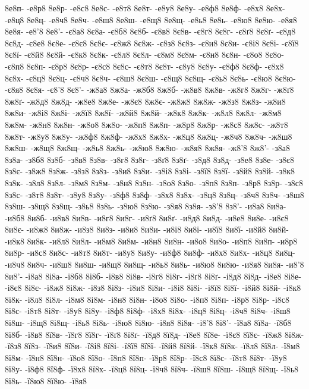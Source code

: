 {8е8п-
-е8р8
8е8р-
-е8с8
8е8с-
-е8т8
8е8т-
-е8у8
8е8у-
-е8ф8
8е8ф-
-е8х8
8е8х-
-е8ц8
8е8ц-
-е8ч8
8е8ч-
-е8ш8
8е8ш-
-е8щ8
8е8щ-
-е8ь8
8е8ь-
-е8ю8
8е8ю-
-е8я8
8е8я-
-е8'8
8е8'-
-є8а8
8є8а-
-є8б8
8є8б-
-є8в8
8є8в-
-є8г8
8є8г-
-є8ґ8
8є8ґ-
-є8д8
8є8д-
-є8е8
8є8е-
-є8є8
8є8є-
-є8ж8
8є8ж-
-є8з8
8є8з-
-є8и8
8є8и-
-є8і8
8є8і-
-є8ї8
8є8ї-
-є8й8
8є8й-
-є8к8
8є8к-
-є8л8
8є8л-
-є8м8
8є8м-
-є8н8
8є8н-
-є8о8
8є8о-
-є8п8
8є8п-
-є8р8
8є8р-
-є8с8
8є8с-
-є8т8
8є8т-
-є8у8
8є8у-
-є8ф8
8є8ф-
-є8х8
8є8х-
-є8ц8
8є8ц-
-є8ч8
8є8ч-
-є8ш8
8є8ш-
-є8щ8
8є8щ-
-є8ь8
8є8ь-
-є8ю8
8є8ю-
-є8я8
8є8я-
-є8'8
8є8'-
-ж8а8
8ж8а-
-ж8б8
8ж8б-
-ж8в8
8ж8в-
-ж8г8
8ж8г-
-ж8ґ8
8ж8ґ-
-ж8д8
8ж8д-
-ж8е8
8ж8е-
-ж8є8
8ж8є-
-ж8ж8
8ж8ж-
-ж8з8
8ж8з-
-ж8и8
8ж8и-
-ж8і8
8ж8і-
-ж8ї8
8ж8ї-
-ж8й8
8ж8й-
-ж8к8
8ж8к-
-ж8л8
8ж8л-
-ж8м8
8ж8м-
-ж8н8
8ж8н-
-ж8о8
8ж8о-
-ж8п8
8ж8п-
-ж8р8
8ж8р-
-ж8с8
8ж8с-
-ж8т8
8ж8т-
-ж8у8
8ж8у-
-ж8ф8
8ж8ф-
-ж8х8
8ж8х-
-ж8ц8
8ж8ц-
-ж8ч8
8ж8ч-
-ж8ш8
8ж8ш-
-ж8щ8
8ж8щ-
-ж8ь8
8ж8ь-
-ж8ю8
8ж8ю-
-ж8я8
8ж8я-
-ж8'8
8ж8'-
-з8а8
8з8а-
-з8б8
8з8б-
-з8в8
8з8в-
-з8г8
8з8г-
-з8ґ8
8з8ґ-
-з8д8
8з8д-
-з8е8
8з8е-
-з8є8
8з8є-
-з8ж8
8з8ж-
-з8з8
8з8з-
-з8и8
8з8и-
-з8і8
8з8і-
-з8ї8
8з8ї-
-з8й8
8з8й-
-з8к8
8з8к-
-з8л8
8з8л-
-з8м8
8з8м-
-з8н8
8з8н-
-з8о8
8з8о-
-з8п8
8з8п-
-з8р8
8з8р-
-з8с8
8з8с-
-з8т8
8з8т-
-з8у8
8з8у-
-з8ф8
8з8ф-
-з8х8
8з8х-
-з8ц8
8з8ц-
-з8ч8
8з8ч-
-з8ш8
8з8ш-
-з8щ8
8з8щ-
-з8ь8
8з8ь-
-з8ю8
8з8ю-
-з8я8
8з8я-
-з8'8
8з8'-
-и8а8
8и8а-
-и8б8
8и8б-
-и8в8
8и8в-
-и8г8
8и8г-
-и8ґ8
8и8ґ-
-и8д8
8и8д-
-и8е8
8и8е-
-и8є8
8и8є-
-и8ж8
8и8ж-
-и8з8
8и8з-
-и8и8
8и8и-
-и8і8
8и8і-
-и8ї8
8и8ї-
-и8й8
8и8й-
-и8к8
8и8к-
-и8л8
8и8л-
-и8м8
8и8м-
-и8н8
8и8н-
-и8о8
8и8о-
-и8п8
8и8п-
-и8р8
8и8р-
-и8с8
8и8с-
-и8т8
8и8т-
-и8у8
8и8у-
-и8ф8
8и8ф-
-и8х8
8и8х-
-и8ц8
8и8ц-
-и8ч8
8и8ч-
-и8ш8
8и8ш-
-и8щ8
8и8щ-
-и8ь8
8и8ь-
-и8ю8
8и8ю-
-и8я8
8и8я-
-и8'8
8и8'-
-і8а8
8і8а-
-і8б8
8і8б-
-і8в8
8і8в-
-і8г8
8і8г-
-і8ґ8
8і8ґ-
-і8д8
8і8д-
-і8е8
8і8е-
-і8є8
8і8є-
-і8ж8
8і8ж-
-і8з8
8і8з-
-і8и8
8і8и-
-і8і8
8і8і-
-і8ї8
8і8ї-
-і8й8
8і8й-
-і8к8
8і8к-
-і8л8
8і8л-
-і8м8
8і8м-
-і8н8
8і8н-
-і8о8
8і8о-
-і8п8
8і8п-
-і8р8
8і8р-
-і8с8
8і8с-
-і8т8
8і8т-
-і8у8
8і8у-
-і8ф8
8і8ф-
-і8х8
8і8х-
-і8ц8
8і8ц-
-і8ч8
8і8ч-
-і8ш8
8і8ш-
-і8щ8
8і8щ-
-і8ь8
8і8ь-
-і8ю8
8і8ю-
-і8я8
8і8я-
-і8'8
8і8'-
-ї8а8
8ї8а-
-ї8б8
8ї8б-
-ї8в8
8ї8в-
-ї8г8
8ї8г-
-ї8ґ8
8ї8ґ-
-ї8д8
8ї8д-
-ї8е8
8ї8е-
-ї8є8
8ї8є-
-ї8ж8
8ї8ж-
-ї8з8
8ї8з-
-ї8и8
8ї8и-
-ї8і8
8ї8і-
-ї8ї8
8ї8ї-
-ї8й8
8ї8й-
-ї8к8
8ї8к-
-ї8л8
8ї8л-
-ї8м8
8ї8м-
-ї8н8
8ї8н-
-ї8о8
8ї8о-
-ї8п8
8ї8п-
-ї8р8
8ї8р-
-ї8с8
8ї8с-
-ї8т8
8ї8т-
-ї8у8
8ї8у-
-ї8ф8
8ї8ф-
-ї8х8
8ї8х-
-ї8ц8
8ї8ц-
-ї8ч8
8ї8ч-
-ї8ш8
8ї8ш-
-ї8щ8
8ї8щ-
-ї8ь8
8ї8ь-
-ї8ю8
8ї8ю-
-ї8я8
}
